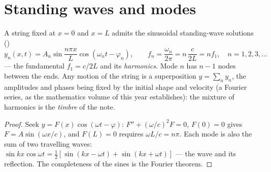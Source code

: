 \section{Standing waves and modes}

\begin{proposition}\label{prop:b2:waves-on-strings:modes}
A string fixed at $x = 0$ and $x = L$ admits the sinusoidal standing-wave
solutions (\emph{})
\[
y_n(x, t) = A_n\sin\frac{n\pi x}{L}\cos(\omega_nt - \varphi_n) , \qquad
f_n = \frac{\omega_n}{2\pi} = n\,\frac{c}{2L} = n f_1 , \quad n = 1, 2, 3, \dots
\]
--- the fundamental $f_1 = c/2L$ and its \emph{harmonics}. Mode $n$ has
$n - 1$ nodes between the ends. Any motion of the string is a
superposition $y = \sum_ny_n$, the amplitudes and phases being fixed by
the initial shape and velocity (a Fourier series, as the mathematics
volume of this year establishes): the mixture of harmonics is the
\emph{timbre} of the note.
\end{proposition}

\begin{proof}
Seek $y = F(x)\cos(\omega t - \varphi)$: $F'' + (\omega/c)^2F = 0$, $F(0) = 0$ gives
$F = A\sin(\omega x/c)$, and $F(L) = 0$ requires $\omega L/c = n\pi$. Each mode is
also the sum of two travelling waves: $\sin kx\cos\omega t = \tfrac12[\sin(kx -
\omega t) + \sin(kx + \omega t)]$ --- the wave and its reflection. The
completeness of the sines is the Fourier theorem.
\end{proof}

